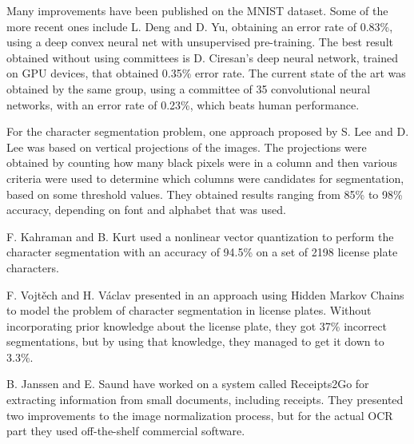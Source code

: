 Many improvements have been published on the MNIST dataset. Some of the more recent ones include L. Deng and D. Yu\cite{deng2011deep}, obtaining an error rate of 0.83\%, using a deep convex neural net with unsupervised pre-training. The best result obtained without using committees is D. Ciresan's deep neural network, trained on GPU devices\cite{Cire_an_2010}, that obtained 0.35\% error rate. The current state of the art was obtained by the same group, using a committee of 35 convolutional neural networks, with an error rate of 0.23\%, which beats human performance\cite{2012arXiv1202.2745C}. 

For the character segmentation problem, one approach proposed by S. Lee and D. Lee\cite{Dong_June_Lee} was based on vertical projections of the images. The projections were obtained by counting how many black pixels were in a column and then various criteria were used to determine which columns were candidates for segmentation, based on some threshold values. They obtained results ranging from 85\% to 98\% accuracy, depending on font and alphabet that was used. 

F. Kahraman and B. Kurt used a nonlinear vector quantization to perform the character segmentation\cite{kahraman2003license} with an accuracy of 94.5\% on a set of 2198 license plate characters. 

F. Vojtěch and H. Václav presented in \cite{Franc_2005} an approach using Hidden Markov Chains to model the problem of character segmentation in license plates. Without incorporating prior knowledge about the license plate, they got 37\% incorrect segmentations, but by using that knowledge, they managed to get it down to 3.3\%.

B. Janssen and E. Saund have worked on a system called Receipts2Go\cite{janssen2012receipts2go} for extracting information from small documents, including receipts. They presented two improvements to the image normalization process, but for the actual OCR part they used off-the-shelf commercial software. 